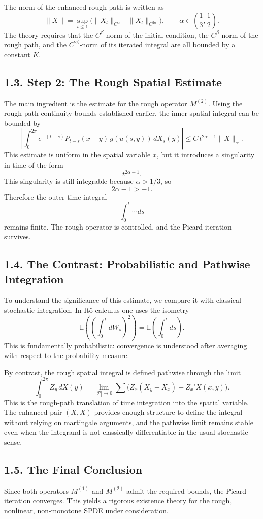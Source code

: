 \documentclass[11pt]{article}
\theoremstyle{definition}
\theoremstyle{remark}
\begin{document}
The norm of the enhanced rough path is written as
\[
\|X\|
=
\sup_{t\le 1}
\bigl(
\|X_t\|_{C^\alpha}+\|X_t\|_{C^{2\alpha}}
\bigr),
\qquad
\alpha\in\left(\frac13,\frac12\right).
\]
The theory requires that the \(C^\beta\)-norm of the initial condition, the \(C^\beta\)-norm of the rough path, and the \(C^{2\beta}\)-norm of its iterated integral are all bounded by a constant \(K\).

\subsection*{1.3. Step 2: The Rough Spatial Estimate}
The main ingredient is the estimate for the rough operator \(M^{(2)}\). Using the rough-path continuity bounds established earlier, the inner spatial integral can be bounded by
\[
\left|
\int_0^{2\pi}
e^{-(t-s)}P_{t-s}(x-y)\,g(u(s,y))\,dX_s(y)
\right|
\le
C\,t^{2\alpha-1}\|X\|_\alpha.
\]
This estimate is uniform in the spatial variable \(x\), but it introduces a singularity in time of the form
\[
t^{2\alpha-1}.
\]
This singularity is still integrable because \(\alpha>1/3\), so
\[
2\alpha-1>-1.
\]
Therefore the outer time integral
\[
\int_0^t \cdots ds
\]
remains finite. The rough operator is controlled, and the Picard iteration survives.

\subsection*{1.4. The Contrast: Probabilistic and Pathwise Integration}
To understand the significance of this estimate, we compare it with classical stochastic integration. In It\^o calculus one uses the isometry
\[
\mathbb E\left(\left(\int_0^t dW_s\right)^2\right)
=
\mathbb E\left(\int_0^t ds\right).
\]
This is fundamentally probabilistic: convergence is understood after averaging with respect to the probability measure.

By contrast, the rough spatial integral is defined pathwise through the limit
\[
\int_0^{2\pi} Z_y\,dX(y)
=
\lim_{|\mathcal P|\to 0}
\sum
\bigl(
Z_x(X_y-X_x)+Z_x'X(x,y)
\bigr).
\]
This is the rough-path translation of time integration into the spatial variable. The enhanced pair \((X,X)\) provides enough structure to define the integral without relying on martingale arguments, and the pathwise limit remains stable even when the integrand is not classically differentiable in the usual stochastic sense.

\subsection*{1.5. The Final Conclusion}
Since both operators \(M^{(1)}\) and \(M^{(2)}\) admit the required bounds, the Picard iteration converges. This yields a rigorous existence theory for the rough, nonlinear, non-monotone SPDE under consideration.
\end{document}
